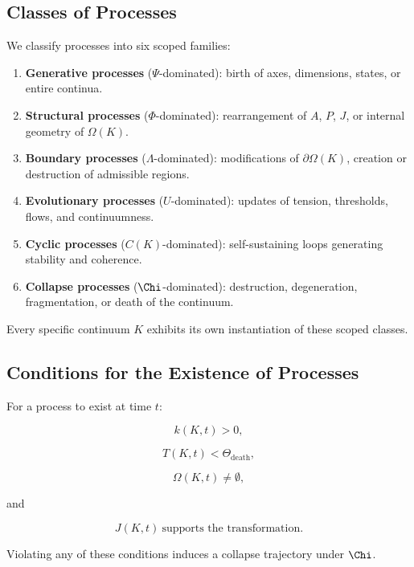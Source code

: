 \subsection{Classes of Processes}

We classify processes into six scoped families:

\begin{enumerate}
    \item \textbf{Generative processes} ($\Psi$-dominated):
    birth of axes, dimensions, states, or entire continua.

    \item \textbf{Structural processes} ($\Phi$-dominated):
    rearrangement of $A$, $P$, $J$, or internal geometry of $\Omega(K)$.

    \item \textbf{Boundary processes} ($\Lambda$-dominated):
    modifications of $\partial\Omega(K)$, creation or destruction of
    admissible regions.

    \item \textbf{Evolutionary processes} ($U$-dominated):
    updates of tension, thresholds, flows, and continuumness.

    \item \textbf{Cyclic processes} ($C(K)$-dominated):
    self-sustaining loops generating stability and coherence.

    \item \textbf{Collapse processes} ($\Chi$-dominated):
    destruction, degeneration, fragmentation, or death of the continuum.
\end{enumerate}

Every specific continuum $K$ exhibits its own instantiation of these
scoped classes.

\subsection{Conditions for the Existence of Processes}

For a process to exist at time $t$:

\[
k(K,t) > 0,
\]

\[
T(K,t) < \Theta_{\mathrm{death}},
\]

\[
\Omega(K,t) \neq \emptyset,
\]

and

\[
J(K,t) \ \text{supports the transformation}.
\]

Violating any of these conditions induces a collapse trajectory under $\Chi$.

